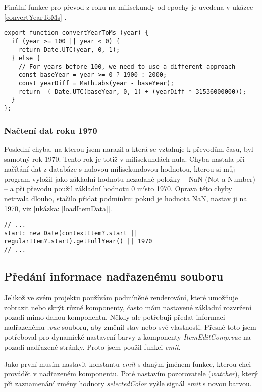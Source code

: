 Finální funkce pro převod z roku na milisekundy od epochy je uvedena v ukázce \ref{convertYearToMs} \cite{UTC-bugfix}.

\newpage
\begin{lstlisting}[style=JavaScript, firstnumber = 3, caption={itemManipulation.js, convertYearToMs}, label={convertYearToMs}]
export function convertYearToMs (year) {
  if (year >= 100 || year < 0) {
    return Date.UTC(year, 0, 1);
  } else {
    // For years before 100, we need to use a different approach
    const baseYear = year >= 0 ? 1900 : 2000;
    const yearDiff = Math.abs(year - baseYear);
    return -(-Date.UTC(baseYear, 0, 1) + (yearDiff * 31536000000));
  }
};
\end{lstlisting}

\subsubsection{Načtení dat roku 1970}
Poslední chyba, na kterou jsem narazil a která se vztahuje k převodům času, byl samotný rok 1970. Tento rok je totiž v milisekundách nula. Chyba nastala při načítání dat z databáze s nulovou milisekundovou hodnotou, kterou si můj program vyložil jako základní hodnotu nezadané položky – NaN (Not a Number) – a při převodu použil základní hodnotu 0 místo 1970. Oprava této chyby netrvala dlouho, stačilo přidat podmínku: pokud je hodnota NaN, nastav ji na 1970, viz [ukázka: \ref{loadItemData}].

\begin{lstlisting}[style=JavaScript, firstnumber = 110, caption={itemManipulation.js, loadItemData}, label={loadItemData}]
// ...
start: new Date(contextItem?.start || regularItem?.start).getFullYear() || 1970
// ...
\end{lstlisting}


\subsection{Předání informace nadřazenému souboru}
Jelikož ve svém projektu používám podmíněné renderování, které umožňuje zobrazit nebo skrýt různé komponenty, často mám nastavené základní rozvržení pozadí mimo danou komponentu. Někdy ale potřebuji předat informaci nadřazenému \textit{.vue} souboru, aby změnil stav nebo své vlastnosti. Přesně toto jsem potřeboval pro dynamické nastavení barvy z komponenty \textit{ItemEditComp.vue} na pozadí nadřazené stránky. Proto jsem použil funkci \textit{emit}.

Jako první musím nastavit konstantu \textit{emit} s daným jménem funkce, kterou chci provádět v nadřazeném komponentu. Poté nastavím pozorovatele (\textit{watcher}), který při zaznamenání změny hodnoty \textit{selectedColor} vyšle signál \textit{emit} s novou barvou.

